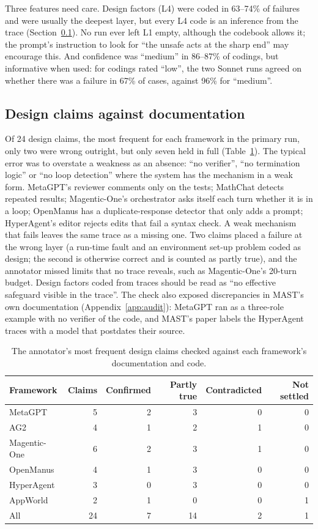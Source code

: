 \documentclass[11pt]{article}
\begin{document}
Three features need care. Design factors (L4) were coded in 63--74\% of failures
and were usually the deepest layer, but every L4 code is an inference from the
trace (Section~\ref{sec:designcheck}). No run ever left L1 empty, although the
codebook allows it; the prompt's instruction to look for ``the unsafe acts at the
sharp end'' may encourage this. And confidence was ``medium'' in 86--87\% of
codings, but informative when used: for codings rated ``low'', the two Sonnet runs
agreed on whether there was a failure in 67\% of cases, against 96\% for
``medium''.

\subsection{Design claims against documentation}
\label{sec:designcheck}

Of 24 design claims, the most frequent for each framework in the primary run, only
two were wrong outright, but only seven held in full (Table~\ref{tab:designcheck}). The typical error was
to overstate a weakness as an absence: ``no verifier'', ``no termination logic'' or
``no loop detection'' where the system has the mechanism in a weak form. MetaGPT's
reviewer comments only on the tests; MathChat detects repeated results;
Magentic-One's orchestrator asks itself each turn whether it is in a loop;
OpenManus has a duplicate-response detector that only adds a prompt; HyperAgent's
editor rejects edits that fail a syntax check. A weak mechanism that fails leaves
the same trace as a missing one. Two claims placed a failure at the wrong layer (a
run-time fault and an environment set-up problem coded as design; the second is
otherwise correct and is counted as partly true), and the
annotator missed limits that no trace reveals, such as Magentic-One's 20-turn
budget. Design factors coded from traces should be read as ``no effective
safeguard visible in the trace''. The check also exposed discrepancies in MAST's
own documentation (Appendix~\ref{app:audit}): MetaGPT ran as a three-role example
with no verifier of the code, and MAST's paper labels the HyperAgent traces with a
model that postdates their source.

\begin{table}[tbp]
\centering
\caption{The annotator's most frequent design claims checked against each
framework's documentation and code.}
\label{tab:designcheck}
\small
\begin{tabular}{@{}lrrrrr@{}}
\toprule
Framework & Claims & Confirmed & Partly true & Contradicted & Not settled\\
\midrule
MetaGPT & 5 & 2 & 3 & 0 & 0\\
AG2 & 4 & 1 & 2 & 1 & 0\\
Magentic-One & 6 & 2 & 3 & 1 & 0\\
OpenManus & 4 & 1 & 3 & 0 & 0\\
HyperAgent & 3 & 0 & 3 & 0 & 0\\
AppWorld & 2 & 1 & 0 & 0 & 1\\
\midrule
All & 24 & 7 & 14 & 2 & 1\\
\bottomrule
\end{tabular}
\end{table}
\end{document}
